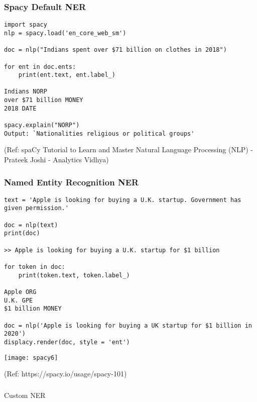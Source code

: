 \begin{frame}[fragile]\frametitle{Spacy Default NER}

\begin{lstlisting}
import spacy
nlp = spacy.load('en_core_web_sm')

doc = nlp("Indians spent over $71 billion on clothes in 2018")
 
for ent in doc.ents:
    print(ent.text, ent.label_)
		
Indians NORP
over $71 billion MONEY
2018 DATE

spacy.explain("NORP")
Output: `Nationalities religious or political groups'
\end{lstlisting}
	
	{\tiny (Ref: spaCy Tutorial to Learn and Master Natural Language Processing (NLP) - Prateek Joshi - Analytics Vidhya)}
\end{frame}


\begin{frame}[fragile]\frametitle{Named Entity Recognition NER}

\begin{lstlisting}
text = 'Apple is looking for buying a U.K. startup. Government has given permission.'

doc = nlp(text)
print(doc)

>> Apple is looking for buying a U.K. startup for $1 billion

for token in doc:
    print(token.text, token.label_)

Apple ORG
U.K. GPE
$1 billion MONEY

doc = nlp('Apple is looking for buying a UK startup for $1 billion in 2020')
displacy.render(doc, style = 'ent')
\end{lstlisting}

\begin{center}
\texttt{[image: spacy6]}
\end{center}

{\tiny (Ref: https://spacy.io/usage/spacy-101)}
\end{frame}


\begin{frame}[fragile]\frametitle{}

\begin{center}
{\Large Custom NER}
\end{center}
\end{frame}

